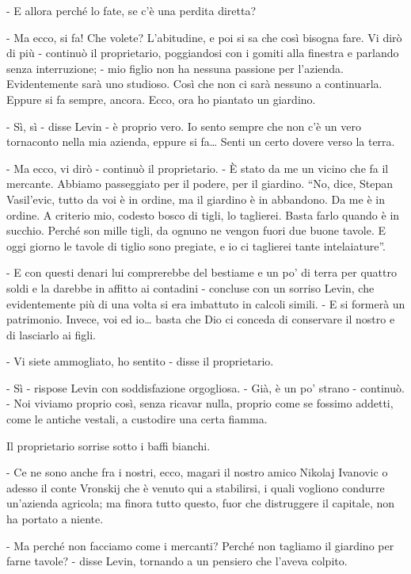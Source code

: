 - E allora perché lo fate, se c'è una perdita diretta? 

- Ma ecco, si fa! Che volete? L'abitudine, e poi si sa che così bisogna fare. Vi dirò di più - continuò il proprietario, poggiandosi con i gomiti alla finestra e parlando senza interruzione; - mio figlio non ha nessuna passione per l'azienda. Evidentemente sarà uno studioso. Così che non ci sarà nessuno a continuarla. Eppure si fa sempre, ancora. Ecco, ora ho piantato un giardino. 

- Sì, sì - disse Levin - è proprio vero. Io sento sempre che non c'è un vero tornaconto nella mia azienda, eppure si fa\ldots{} Senti un certo dovere verso la terra. 

- Ma ecco, vi dirò - continuò il proprietario. - È stato da me un vicino che fa il mercante. Abbiamo passeggiato per il podere, per il giardino. ``No, dice, Stepan Vasil'evic, tutto da voi è in ordine, ma il giardino è in abbandono. Da me è in ordine. A criterio mio, codesto bosco di tigli, lo taglierei. Basta farlo quando è in succhio. Perché son mille tigli, da ognuno ne vengon fuori due buone tavole. E oggi giorno le tavole di tiglio sono pregiate, e io ci taglierei tante intelaiature''. 

- E con questi denari lui comprerebbe del bestiame e un po' di terra per quattro soldi e la darebbe in affitto ai contadini - concluse con un sorriso Levin, che evidentemente più di una volta si era imbattuto in calcoli simili. - E si formerà un patrimonio. Invece, voi ed io\ldots{} basta che Dio ci conceda di conservare il nostro e di lasciarlo ai figli. 

- Vi siete ammogliato, ho sentito - disse il proprietario. 

- Sì - rispose Levin con soddisfazione orgogliosa. - Già, è un po' strano - continuò. - Noi viviamo proprio così, senza ricavar nulla, proprio come se fossimo addetti, come le antiche vestali, a custodire una certa fiamma. 

Il proprietario sorrise sotto i baffi bianchi. 

- Ce ne sono anche fra i nostri, ecco, magari il nostro amico Nikolaj Ivanovic o adesso il conte Vronskij che è venuto qui a stabilirsi, i quali vogliono condurre un'azienda agricola; ma finora tutto questo, fuor che distruggere il capitale, non ha portato a niente. 

- Ma perché non facciamo come i mercanti? Perché non tagliamo il giardino per farne tavole? - disse Levin, tornando a un pensiero che l'aveva colpito. 

